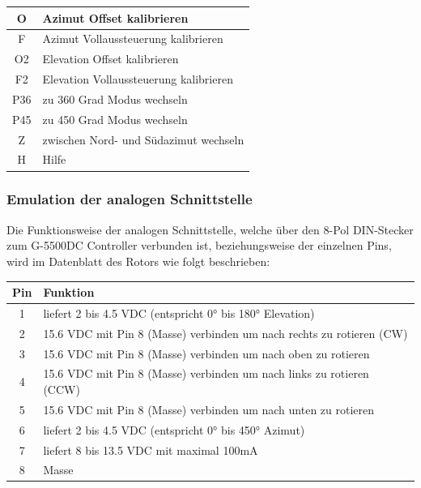\begin{table}[H]
\begin{tabular}{| c | l |}
		\hline
		O & Azimut Offset kalibrieren \\
		\hline 
		F & Azimut Vollaussteuerung kalibrieren \\
		\hline
		O2 & Elevation Offset kalibrieren \\
		\hline
		F2 & Elevation Vollaussteuerung kalibrieren \\
		\hline 
		P36 & zu 360 Grad Modus wechseln \\
		\hline 
		P45 & zu 450 Grad Modus wechseln \\
		\hline 
		Z & zwischen Nord- und Südazimut wechseln \\
		\hline
		H & Hilfe \\
		\hline
	\end{tabular}
\end{table}

\subsubsection{Emulation der analogen Schnittstelle}
\label{subsubsec:emulation_analoge_schnittstelle}
Die Funktionsweise der analogen Schnittstelle, welche über den 8-Pol DIN-Stecker zum G-5500DC Controller verbunden ist, beziehungsweise der einzelnen Pins, wird im Datenblatt des Rotors \cite{noauthor_yaesu_nodate} wie folgt beschrieben:

\begin{table}[H]
	\centering
	\begin{tabular}{| c | l |}
		\hline
		\textbf{Pin} & \textbf{Funktion} \\
		\hline
		1 & liefert 2 bis 4.5 VDC (entspricht 0° bis 180° Elevation) \\
		\hline
		2 & 15.6 VDC mit Pin 8 (Masse) verbinden um nach rechts zu rotieren (CW) \\
		\hline
		3 & 15.6 VDC mit Pin 8 (Masse) verbinden um nach oben zu rotieren \\
		\hline
		4 & 15.6 VDC mit Pin 8 (Masse) verbinden um nach links zu rotieren (CCW) \\
		\hline
		5 & 15.6 VDC mit Pin 8 (Masse) verbinden um nach unten zu rotieren \\
		\hline
		6 & liefert 2 bis 4.5 VDC (entspricht 0° bis 450° Azimut) \\
		\hline
		7 & liefert 8 bis 13.5 VDC mit maximal 100mA \\
		\hline
		8 & Masse \\
		\hline
	\end{tabular}
\end{table}

